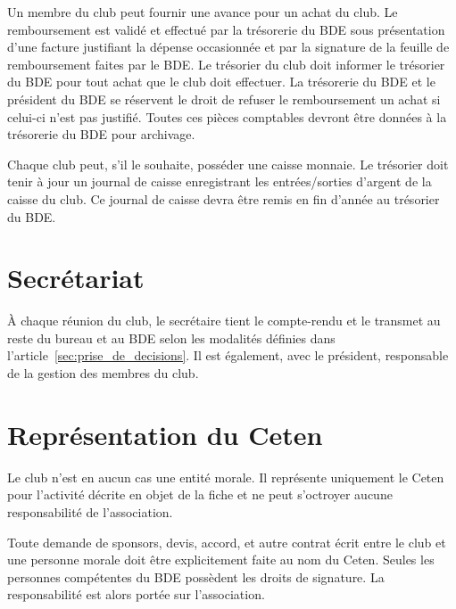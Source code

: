 \documentclass{article}
\begin{document}
\begin{multicols}{2}
{			Un membre du club peut fournir une avance pour un achat du club. Le
			remboursement est validé et effectué par la trésorerie du BDE sous
			présentation d’une facture justifiant la dépense occasionnée et par
			la signature de la feuille de remboursement faites par le BDE\@. Le
			trésorier du club doit informer le trésorier du BDE pour tout achat
			que le club doit effectuer. La trésorerie du BDE et le président du
			BDE se réservent le droit de refuser le remboursement un achat si
			celui-ci n’est pas justifié. Toutes ces pièces comptables devront
			être données à la trésorerie du BDE pour archivage.

			Chaque club peut, s’il le souhaite, posséder une caisse
			monnaie. Le trésorier doit tenir à jour un journal de caisse
			enregistrant les entrées/sorties d’argent de la caisse du
			club. Ce journal de caisse devra être remis en fin d’année au
			trésorier du BDE\@.

		}

		\section{Secrétariat}
\label{sec:secretariat}

		{\small
		
			À chaque réunion du club, le secrétaire tient le compte-rendu et le
			transmet au reste du bureau et au BDE selon les modalités définies
			dans l'article~\ref{sec:prise_de_decisions}. Il est également, avec
			le président, responsable de la gestion des membres du club.
		
		}

		\section{Représentation du Ceten}
\label{sec:representation_du_ceten}

		{\small

			Le club n’est en aucun cas une entité morale. Il représente
			uniquement le Ceten pour l’activité décrite en objet de la fiche et
			ne peut s’octroyer aucune responsabilité de l’association.

			Toute demande de sponsors, devis, accord, et autre contrat écrit
			entre le club et une personne morale doit être explicitement faite
			au nom du Ceten. Seules les personnes compétentes du BDE possèdent
			les droits de signature. La responsabilité est alors portée sur
			l’association.

		}


\end{multicols}
\end{document}
